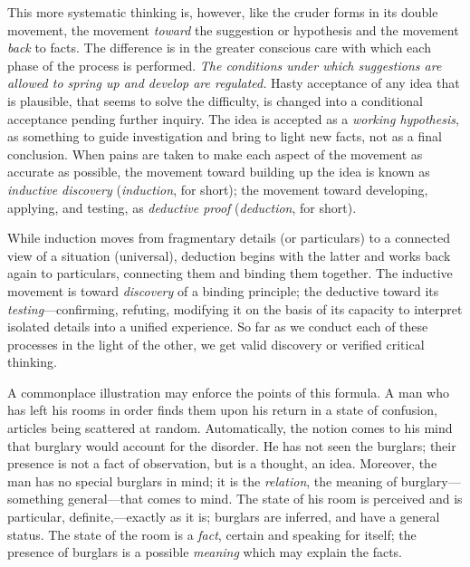 \documentclass[showtrims,ustradepaper]{memoir}
\begin{document}

This more systematic thinking is, however, like the cruder forms in its
double movement, the movement \emph{toward} the suggestion or hypothesis
and the movement \emph{back} to facts. The difference is in the greater
conscious care with which each phase of the process is performed.
\emph{The conditions under which suggestions are allowed to spring up
and develop are regulated.} Hasty acceptance of any idea that is
plausible, that seems to solve the difficulty, is changed into a
conditional acceptance pending further inquiry. The idea is accepted as
a \emph{working hypothesis}, as something to guide investigation and
bring to light new facts, not as a final conclusion. When pains are
taken to make each aspect of the movement as accurate as possible, the
movement toward building up the idea is known as \emph{inductive
discovery} (\emph{induction}, for short); the movement toward
developing, applying, and testing, as \emph{deductive proof}
(\emph{deduction}, for short).


While induction moves from fragmentary details
(or
particulars) to a connected view of a situation (universal), deduction
begins with the latter and works back again to particulars, connecting
them and binding them together. The inductive movement is toward
\emph{discovery} of a binding principle; the deductive toward its
\emph{testing}---confirming, refuting, modifying it on the basis of its
capacity to interpret isolated details into a unified experience. So far
as we conduct each of these processes in the light of the other, we get
valid discovery or verified critical thinking.


A commonplace illustration may enforce the points of this formula. A man
who has left his rooms in order finds them upon his return in a state of
confusion, articles being scattered at random. Automatically, the notion
comes to his mind that burglary would account for the disorder. He has
not seen the burglars; their presence is not a fact of observation, but
is a thought, an idea. Moreover, the man has no special burglars in
mind; it is the \emph{relation}, the meaning of burglary---something
general---that comes to mind. The state of his room is perceived and is
particular, definite,---exactly as it is; burglars are inferred, and
have a general status. The state of the room is a \emph{fact}, certain
and speaking for itself; the presence of burglars is a possible
\emph{meaning} which may explain the facts.
\end{document}
